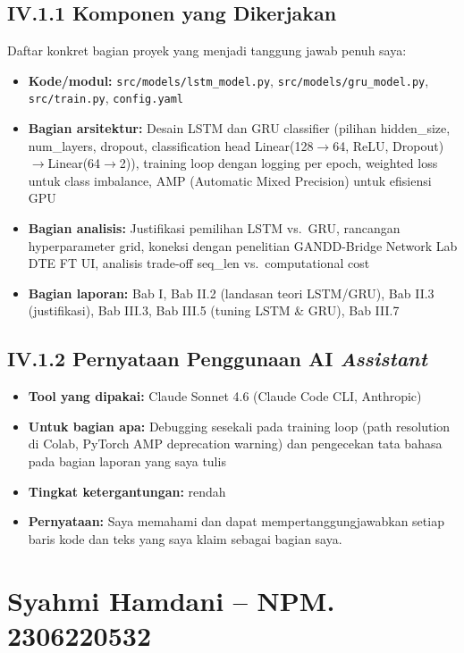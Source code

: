 \documentclass[11pt,a4paper,oneside]{report}
\begin{document}
\subsection*{IV.1.1 Komponen yang Dikerjakan}
Daftar konkret bagian proyek yang menjadi tanggung jawab penuh saya:
\begin{itemize}[leftmargin=*]
    \item \textbf{Kode/modul:} \texttt{src/models/lstm\_model.py}, \texttt{src/models/gru\_model.py}, \texttt{src/train.py}, \texttt{config.yaml}
    \item \textbf{Bagian arsitektur:} Desain LSTM dan GRU classifier (pilihan hidden\_size, num\_layers, dropout, classification head Linear(128$\to$64, ReLU, Dropout)$\to$Linear(64$\to$2)), training loop dengan logging per epoch, weighted loss untuk class imbalance, AMP (Automatic Mixed Precision) untuk efisiensi GPU
    \item \textbf{Bagian analisis:} Justifikasi pemilihan LSTM vs.\ GRU, rancangan hyperparameter grid, koneksi dengan penelitian GANDD-Bridge Network Lab DTE FT UI, analisis trade-off seq\_len vs.\ computational cost
    \item \textbf{Bagian laporan:} Bab I, Bab II.2 (landasan teori LSTM/GRU), Bab II.3 (justifikasi), Bab III.3, Bab III.5 (tuning LSTM \& GRU), Bab III.7
\end{itemize}

\subsection*{IV.1.2 Pernyataan Penggunaan AI \textit{Assistant}}
\begin{itemize}[leftmargin=*]
    \item \textbf{Tool yang dipakai:} Claude Sonnet 4.6 (Claude Code CLI, Anthropic)
    \item \textbf{Untuk bagian apa:} Debugging sesekali pada training loop (path resolution di Colab, PyTorch AMP deprecation warning) dan pengecekan tata bahasa pada bagian laporan yang saya tulis
    \item \textbf{Tingkat ketergantungan:} rendah
    \item \textbf{Pernyataan:} Saya memahami dan dapat mempertanggungjawabkan setiap baris kode dan teks yang saya klaim sebagai bagian saya.
\end{itemize}

\section{Syahmi Hamdani -- NPM. 2306220532}
\end{document}
